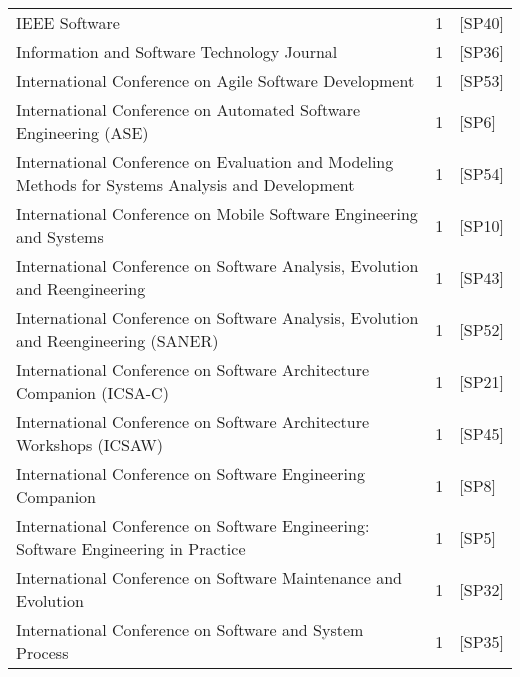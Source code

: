 \begin{tabular}{lrl}
                                                                                    IEEE Software &      1 &                                     [SP40] \\
                                                      Information and Software Technology Journal &      1 &                                     [SP36] \\
                                           International Conference on Agile Software Development &      1 &                                     [SP53] \\
                                 International Conference on Automated Software Engineering (ASE) &      1 &                                      [SP6] \\
 International Conference on Evaluation and Modeling Methods for Systems Analysis and Development &      1 &                                     [SP54] \\
                              International Conference on Mobile Software Engineering and Systems &      1 &                                     [SP10] \\
                       International Conference on Software Analysis, Evolution and Reengineering &      1 &                                     [SP43] \\
               International Conference on Software Analysis, Evolution and Reengineering (SANER) &      1 &                                     [SP52] \\
                             International Conference on Software Architecture Companion (ICSA-C) &      1 &                                     [SP21] \\
                              International Conference on Software Architecture Workshops (ICSAW) &      1 &                                     [SP45] \\
                                       International Conference on Software Engineering Companion &      1 &                                      [SP8] \\
               International Conference on Software Engineering: Software Engineering in Practice &      1 &                                      [SP5] \\
                                   International Conference on Software Maintenance and Evolution &      1 &                                     [SP32] \\
                                          International Conference on Software and System Process &      1 &                                     [SP35] \\

\end{tabular}
